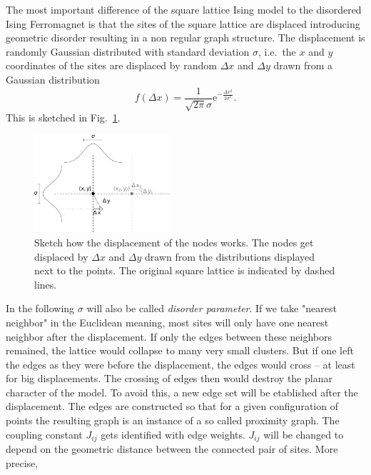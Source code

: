 The most important difference of the square lattice Ising model to the
disordered Ising Ferromagnet is that the sites of the square lattice are
displaced introducing geometric disorder resulting in a non regular graph
structure.
The displacement is randomly Gaussian distributed with standard
deviation \(\sigma\), i.e.\ the \(x\) and \(y\) coordinates of the
sites are displaced by random \(\Delta x\) and \(\Delta y\) drawn
from a Gaussian distribution
\begin{equation}
    f(\Delta x)=\frac{1}{\sqrt{2\pi}\sigma}\mathrm{e}^{-\frac{\Delta x^2}{2\sigma^2}}.
    \label{eq:gauss}
\end{equation}
This is sketched in Fig.\ \ref{fig:displacement}.
\begin{figure}[htbp]
    \centering
    \includegraphics[width=0.45\textwidth]{images/Displacement}
    \caption[Sketch how the Displacement works]
    {
        Sketch how the displacement of the nodes works. The nodes
        get displaced by \(\Delta x\) and \(\Delta y\) drawn from the
        distributions displayed next to the points. The original
        square lattice is indicated by dashed lines.
    }
    \label{fig:displacement}
\end{figure}
In the following \(\sigma\) will also be called \emph{disorder parameter}.
If we take "nearest neighbor" in the Euclidean meaning, most sites
will only have one nearest neighbor after the
displacement. If only the edges between these neighbors remained,
the lattice would collapse to many very small clusters. But if one
left the edges as they were before the displacement, the edges would
cross -- at least for big displacements. The crossing of edges then
would destroy the planar character of the model.
To avoid this, a new edge set will be etablished after the displacement.
The edges are constructed
so that for a given configuration of points the resulting graph is an
instance of a so called proximity graph. The coupling constant \(J_{ij}\) gets
identified with edge weights. \(J_{ij}\) will be changed to depend on the
geometric distance between the connected pair of sites. More precise,
